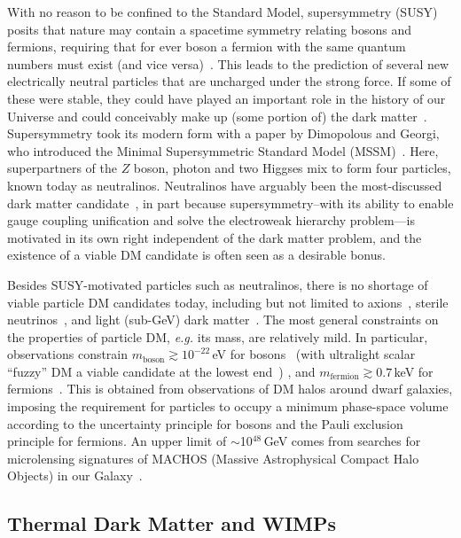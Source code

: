 With no reason to be confined to the Standard Model, supersymmetry (SUSY) posits that nature may contain a spacetime symmetry relating bosons and fermions, requiring that for ever boson a fermion with the same quantum numbers must exist (and vice versa)~\cite{Wess:1974tw,PhysRevLett.48.223}. This leads to the prediction of several new electrically neutral particles that are uncharged under the strong force. If some of these were stable, they could have played an important role in the history of our Universe and could conceivably make up (some portion of) the dark matter~\cite{Jungman:1995df}. Supersymmetry took its modern form with a paper by Dimopolous and Georgi, who introduced the Minimal Supersymmetric Standard Model (MSSM)~\cite{Dimopoulos:1981zb}. Here, superpartners of the $Z$ boson, photon and two Higgses mix to form four particles, known today as neutralinos. Neutralinos have arguably been the most-discussed dark matter candidate~\cite{Bertone:2004pz}, in part because supersymmetry--with its ability to enable gauge coupling unification and solve the electroweak hierarchy problem---is motivated in its own right independent of the dark matter problem, and the existence of a viable DM candidate is often seen as a desirable bonus.

Besides SUSY-motivated particles such as neutralinos, there is no shortage of viable particle DM candidates today, including but not limited to axions~\cite{PhysRevLett.40.223,Peccei:1977hh}, sterile neutrinos~\cite{Abazajian:2001nj,Seljak:2006qw}, and light (sub-GeV) dark matter~\cite{Feng:2008ya,Lin:2011gj}. The most general constraints on the properties of particle DM, \emph{e.g.} its mass, are relatively mild. In particular, observations constrain $m_\text{boson} \gtrsim 10^{-22}$\,eV for bosons~\cite{Zhang:2017chj} (with ultralight scalar ``fuzzy'' DM a viable candidate at the lowest end~\cite{Hui:2016ltb}) , and $m_\text{fermion} \gtrsim 0.7$\,keV for fermions~\cite{Horiuchi:2013noa}. This is obtained from observations of DM halos around dwarf galaxies, imposing the requirement for particles to occupy a minimum phase-space volume according to the uncertainty principle for bosons and the Pauli exclusion principle for fermions. An upper limit of $\sim$10$^{48}$\,GeV comes from searches for microlensing signatures of MACHOS (Massive Astrophysical Compact Halo Objects) in our Galaxy~\cite{Griest:2013aaa}.

\subsection{Thermal Dark Matter and WIMPs}

